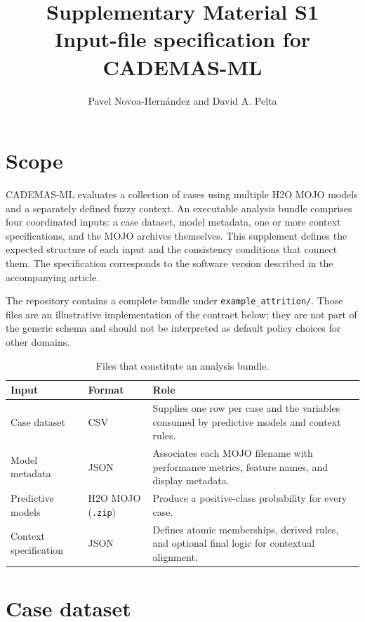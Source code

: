 \documentclass[11pt,a4paper]{article}
\title{\textbf{Supplementary Material S1}\\[4pt]
Input-file specification for CADEMAS-ML}
\author{Pavel Novoa-Hern\'{a}ndez and David A. Pelta}
\date{}
\begin{document}
\maketitle

\section{Scope}

CADEMAS-ML evaluates a collection of cases using multiple H2O MOJO models and a separately defined fuzzy context. An executable analysis bundle comprises four coordinated inputs: a case dataset, model metadata, one or more context specifications, and the MOJO archives themselves. This supplement defines the expected structure of each input and the consistency conditions that connect them. The specification corresponds to the software version described in the accompanying article.

The repository contains a complete bundle under \texttt{example\_attrition/}. Those files are an illustrative implementation of the contract below; they are not part of the generic schema and should not be interpreted as default policy choices for other domains.

\begin{table}[ht]
\centering
\caption{Files that constitute an analysis bundle.}
\begin{tabularx}{\textwidth}{>{\raggedright\arraybackslash}p{3.1cm} >{\raggedright\arraybackslash}p{2.3cm} >{\raggedright\arraybackslash}X}
\toprule
\textbf{Input} & \textbf{Format} & \textbf{Role} \\
\midrule
Case dataset & CSV & Supplies one row per case and the variables consumed by predictive models and context rules. \\
Model metadata & JSON & Associates each MOJO filename with performance metrics, feature names, and display metadata. \\
Predictive models & H2O MOJO (\texttt{.zip}) & Produce a positive-class probability for every case. \\
Context specification & JSON & Defines atomic memberships, derived rules, and optional final logic for contextual alignment. \\
\bottomrule
\end{tabularx}
\end{table}

\section{Case dataset}
\end{document}
